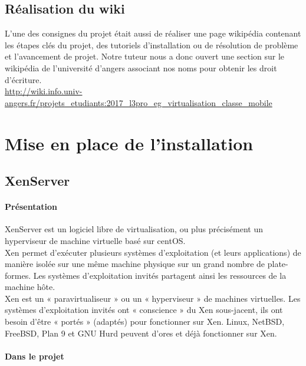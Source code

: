 \documentclass[a4paper,12pt]{extarticle}
\begin{document}
\clearpage

\subsection{Réalisation du wiki}

L’une des consignes du projet était aussi de réaliser une page wikipédia contenant les étapes clés du projet, des tutoriels d’installation ou de résolution de problème et l’avancement de projet.\newline
Notre tuteur nous a donc ouvert une section sur le wikipédia de l’université d’angers associant nos noms pour obtenir les droit d’écriture.\\

\url{http://wiki.info.univ-angers.fr/projets_etudiants:2017_l3pro_eg_virtualisation_classe_mobile}

\clearpage

\section{Mise en place de l'installation}
\subsection{XenServer}
\paragraph{Présentation\\}


XenServer est un logiciel libre de virtualisation, ou plus précisément un hyperviseur de machine virtuelle basé sur centOS.\\

Xen permet d'exécuter plusieurs systèmes d'exploitation (et leurs applications) de manière isolée sur une même machine physique sur un grand nombre de plate-formes. Les systèmes d'exploitation invités partagent ainsi les ressources de la machine hôte.\\

Xen est un « paravirtualiseur » ou un « hyperviseur » de machines virtuelles. Les systèmes d'exploitation invités ont « conscience » du Xen sous-jacent, ils ont besoin d'être « portés » (adaptés) pour fonctionner sur Xen. Linux, NetBSD, FreeBSD, Plan 9 et GNU Hurd peuvent d'ores et déjà fonctionner sur Xen.\\

\paragraph{Dans le projet\\}
\end{document}
